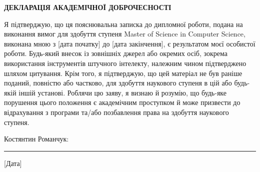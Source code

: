 
\begin{center}
{\fontsize{14pt}{16.8pt}\selectfont\bfseries
ДЕКЛАРАЦІЯ АКАДЕМІЧНОЇ ДОБРОЧЕСНОСТІ
}
\end{center}

\vspace{2cm}

Я підтверджую, що ця пояснювальна записка до дипломної роботи, подана на виконання вимог для здобуття ступеня Master of Science in Computer Science, виконана мною з [дата початку] до [дата закінчення], є результатом моєї особистої роботи. Будь-який внесок із зовнішніх джерел або окремих осіб, зокрема використання інструментів штучного інтелекту, належним чином підтверджено шляхом цитування. Крім того, я підтверджую, що цей матеріал не був раніше поданий, повністю або частково, для здобуття наукового ступеня в цій або будь-якій іншій установі. Роблячи цю заяву, я визнаю й розумію, що будь-яке порушення цього положення є академічним проступком й може призвести до відрахування з програми та/або позбавлення права на здобуття наукового ступеня.

\vspace{1cm}

\vspace{4cm}

\noindent
Костянтин Романчук: \rule{0.3\textwidth}{0.4pt}\hspace{1cm} [Дата]
